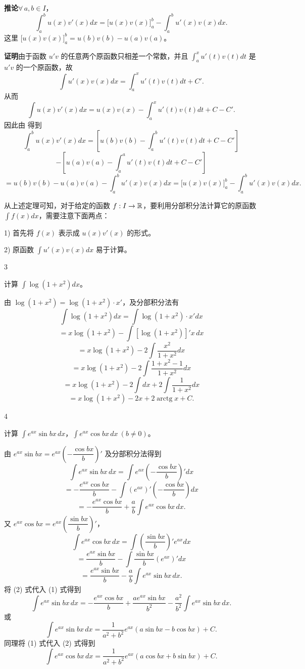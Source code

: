 \textbf{推论}\quad \(\forall\,a,b\in I\)，
\[
\int_a^b u(x)v'(x)dx=\bigl[u(x)v(x)\bigr]_a^b-\int_a^b u'(x)v(x)dx.
\]
这里 \(\bigl[u(x)v(x)\bigr]_a^b=u(b)v(b)-u(a)v(a)\)。

\textbf{证明}\quad 由于函数 \(u'v\) 的任意两个原函数只相差一个常数，并且 \(\displaystyle\int_a^x u'(t)v(t)dt\) 是 \(u'v\) 的一个原函数，故
\[
\int u'(x)v(x)dx=\int_a^x u'(t)v(t)dt+C'.
\]
从而
\[
\int u(x)v'(x)dx=u(x)v(x)-\int_a^x u'(t)v(t)dt+C-C'.
\]
因此由 得到
\[
\int_a^b u(x)v'(x)dx=\left[u(b)v(b)-\int_a^b u'(t)v(t)dt+C-C'\right]
\]
\[
-\left[u(a)v(a)-\int_a^a u'(t)v(t)dt+C-C'\right]
\]
\[
=u(b)v(b)-u(a)v(a)-\int_a^b u'(x)v(x)dx=\bigl[u(x)v(x)\bigr]_a^b-\int_a^b u'(x)v(x)dx.
\]

从上述定理可知，对于给定的函数 \(f:I\to\mathbb{R}\)，要利用分部积分法计算它的原函数 \(\displaystyle\int f(x)dx\)，需要注意下面两点：

1) 首先将 \(f(x)\) 表示成 \(u(x)v'(x)\) 的形式。

2) 原函数 \(\displaystyle\int u'(x)v(x)dx\) 易于计算。

\begin{sourceexample}{3}

	计算 \(\displaystyle\int\log(1+x^2)dx\)。

	由 \(\log(1+x^2)=\log(1+x^2)\cdot x'\)，及分部积分法有
	\[
	\int\log(1+x^2)dx=\int\log(1+x^2)\cdot x'dx
	\]
	\[
	=x\log(1+x^2)-\int[\log(1+x^2)]'x\,dx
	\]
	\[
	=x\log(1+x^2)-2\int\frac{x^2}{1+x^2}dx
	\]
	\[
	=x\log(1+x^2)-2\int\frac{1+x^2-1}{1+x^2}dx
	\]
	\[
	=x\log(1+x^2)-2\int dx+2\int\frac1{1+x^2}dx
	\]
	\[
	=x\log(1+x^2)-2x+2\operatorname{arctg}x+C.
	\]

\end{sourceexample}

\begin{sourceexample}{4}

	计算 \(\displaystyle\int e^{ax}\sin bx\,dx\)，\(\displaystyle\int e^{ax}\cos bx\,dx\ (b\neq0)\)。

	由 \(e^{ax}\sin bx=e^{ax}\left(-\dfrac{\cos bx}{b}\right)'\) 及分部积分法得到
	\[
	\int e^{ax}\sin bx\,dx=\int e^{ax}\left(-\frac{\cos bx}{b}\right)'dx
	\]
	\[
	=-\frac{e^{ax}\cos bx}{b}-\int(e^{ax})'\left(-\frac{\cos bx}{b}\right)dx
	\]
	\[
	=-\frac{e^{ax}\cos bx}{b}+\frac ab\int e^{ax}\cos bx\,dx. \tag{1}
	\]
	又 \(e^{ax}\cos bx=e^{ax}\left(\dfrac{\sin bx}{b}\right)'\)，
	\[
	\int e^{ax}\cos bx\,dx=\int\left(\frac{\sin bx}{b}\right)'e^{ax}dx
	\]
	\[
	=\frac{e^{ax}\sin bx}{b}-\int\frac{\sin bx}{b}(e^{ax})'dx
	\]
	\[
	=\frac{e^{ax}\sin bx}{b}-\frac ab\int e^{ax}\sin bx\,dx. \tag{2}
	\]
	将 (2) 式代入 (1) 式得到
	\[
	\int e^{ax}\sin bx\,dx=-\frac{e^{ax}\cos bx}{b}+\frac{ae^{ax}\sin bx}{b^2}-\frac{a^2}{b^2}\int e^{ax}\sin bx\,dx.
	\]
	或
	\[
	\int e^{ax}\sin bx\,dx=\frac1{a^2+b^2}e^{ax}(a\sin bx-b\cos bx)+C.
	\]
	同理将 (1) 式代入 (2) 式得到
	\[
	\int e^{ax}\cos bx\,dx=\frac1{a^2+b^2}e^{ax}(a\cos bx+b\sin bx)+C.
	\]

\end{sourceexample}

